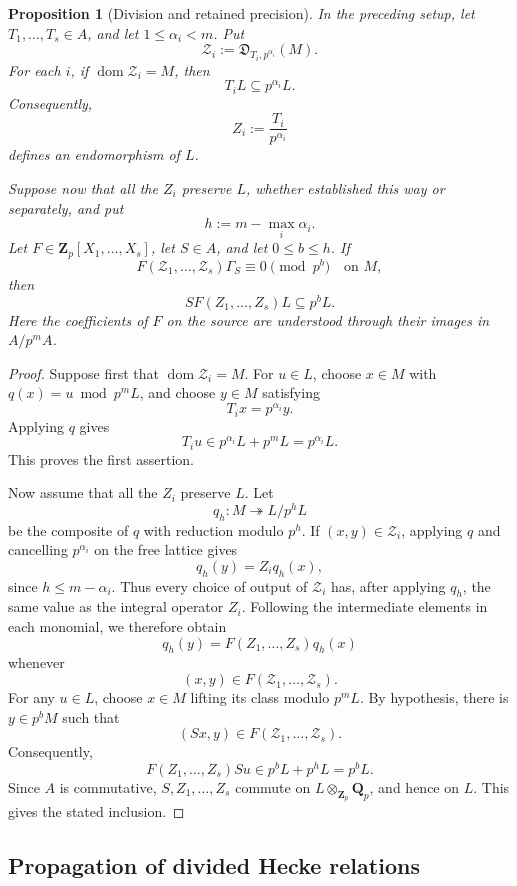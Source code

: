 \documentclass[11pt]{article}
\theoremstyle{plain}
\newtheorem{proposition}[theorem]{Proposition}
\theoremstyle{definition}
\theoremstyle{remark}
\numberwithin{equation}{section}
\begin{document}
\begin{proposition}[Division and retained precision] \label{prop:division-retained-precision} In the preceding setup, let \(T_1,\ldots,T_s\in A\), and let \(1\leq\alpha_i<m\). Put \[ \mathcal Z_i:=\mathfrak D_{T_i,p^{\alpha_i}}(M). \] For each \(i\), if \(\operatorname{dom}\mathcal Z_i=M\), then \[ T_iL\subseteq p^{\alpha_i}L. \] Consequently, \[ Z_i:=\frac{T_i}{p^{\alpha_i}} \] defines an endomorphism of \(L\).  
     
Suppose now that all the \(Z_i\) preserve \(L\), whether established this way or separately, and put \[ h:=m-\max_i\alpha_i. \] Let \(F\in\mathbf Z_p[X_1,\ldots,X_s]\), let \(S\in A\), and let \(0\leq b\leq h\). If \[ F(\mathcal Z_1,\ldots,\mathcal Z_s)\Gamma_S \equiv0\pmod{p^b}\quad\text{on }M, \] then \[ S F(Z_1,\ldots,Z_s)L\subseteq p^bL. \] Here the coefficients of \(F\) on the source are understood through their images in \(A/p^mA\).\end{proposition}

\begin{proof} Suppose first that \(\operatorname{dom}\mathcal Z_i=M\). For \(u\in L\), choose \(x\in M\) with \(q(x)=u\bmod p^mL\), and choose \(y\in M\) satisfying \[ T_i x=p^{\alpha_i}y. \] Applying \(q\) gives \[ T_i u\in p^{\alpha_i}L+p^mL=p^{\alpha_i}L. \] This proves the first assertion.

Now assume that all the \(Z_i\) preserve \(L\). Let \[ q_h:M\twoheadrightarrow L/p^hL \] be the composite of \(q\) with reduction modulo \(p^h\). If \((x,y)\in\mathcal Z_i\), applying \(q\) and cancelling \(p^{\alpha_i}\) on the free lattice gives \[ q_h(y)=Z_iq_h(x), \] since \(h\leq m-\alpha_i\). Thus every choice of output of \(\mathcal Z_i\) has, after applying \(q_h\), the same value as the integral operator \(Z_i\). Following the intermediate elements in each monomial, we therefore obtain \[ q_h(y)=F(Z_1,\ldots,Z_s)q_h(x) \] whenever \[ (x,y)\in F(\mathcal Z_1,\ldots,\mathcal Z_s). \] For any \(u\in L\), choose \(x\in M\) lifting its class modulo \(p^mL\). By hypothesis, there is \(y\in p^bM\) such that \[ (Sx,y)\in F(\mathcal Z_1,\ldots,\mathcal Z_s). \] Consequently, \[ F(Z_1,\ldots,Z_s)Su\in p^bL+p^hL=p^bL. \] Since \(A\) is commutative, \(S,Z_1,\ldots,Z_s\) commute on \(L\otimes_{\mathbf Z_p}\mathbf Q_p\), and hence on \(L\). This gives the stated inclusion.
\end{proof}

\subsection{Propagation of divided Hecke relations}
\label{sec:divided-relation-propagation}
\end{document}
